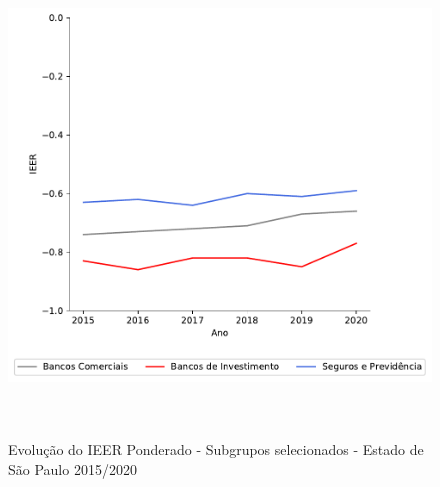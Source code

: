     \begin{figure}[htb!]
        \centering
        \caption{Evolução do IEER Ponderado - Subgrupos selecionados - Estado de São Paulo 2015/2020}
            \includegraphics[height=12cm]{images/cnae_fin_ieer.pdf}
        \label{fig1}
    \end{figure}